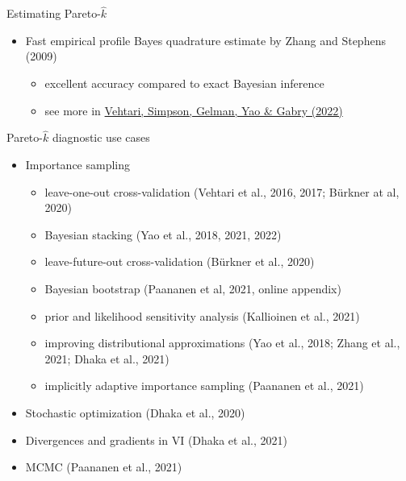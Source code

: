 \documentclass[english,t]{beamer}
\begin{document}
\begin{frame}{Estimating Pareto-$\hat{k}$}

  \begin{itemize}
  \item Fast empirical profile Bayes quadrature estimate by Zhang and
    Stephens (2009)
    \begin{itemize}
    \item excellent accuracy compared to exact Bayesian inference
    \item see more in \href{https://arxiv.org/abs/1507.02646}{Vehtari, Simpson, Gelman, Yao \& Gabry (2022)}
    \end{itemize}
  \end{itemize}

\end{frame}

\begin{frame}{Pareto-$\hat{k}$ diagnostic use cases}

  \vspace{-.5\baselineskip}
  \begin{itemize}
  \item Importance sampling
    \begin{itemize}
    \item leave-one-out cross-validation (Vehtari et al., 2016, 2017; Bürkner at al, 2020)
    \item Bayesian stacking (Yao et al., 2018, 2021, 2022)
    \item leave-future-out cross-validation (Bürkner et al., 2020)
    \item Bayesian bootstrap (Paananen et al, 2021, online appendix)
    \item prior and likelihood sensitivity analysis (Kallioinen et al., 2021)
    \item improving distributional approximations (Yao et al., 2018; Zhang et al., 2021; Dhaka et al., 2021)
    \item implicitly adaptive importance sampling (Paananen et al., 2021)
    \end{itemize}
  \item Stochastic optimization (Dhaka et al., 2020)
  \item Divergences and gradients in VI (Dhaka et al., 2021)
  \item MCMC (Paananen et al., 2021)
  \end{itemize}

\end{frame}
\end{document}
